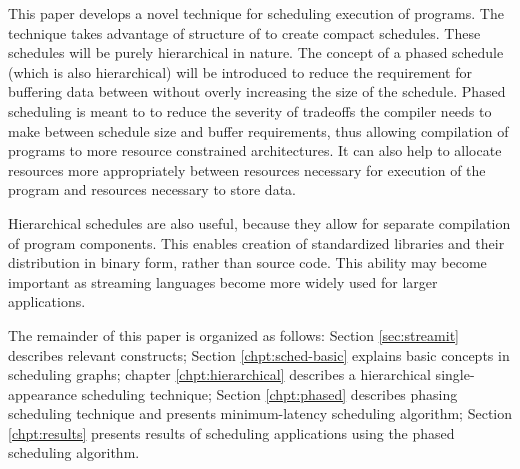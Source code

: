 \begin{comment}
This problem is further complicated by message latency constraints
placed on the program by the programmer.  While {\StreamIt}
programs are meant to provide relatively lax latency requirements,
it is possible to write programs with latency constraints so tight
that very few valid schedules exist. Finding these schedules is a
challenging task.
\end{comment}

This paper develops a novel technique for scheduling execution of
{\StreamIt} programs. The technique takes advantage of structure
of {\StreamIt} to create compact schedules. These schedules will
be purely hierarchical in nature. The concept of a phased schedule
(which is also hierarchical) will be introduced to reduce the
requirement for buffering data between {\filters} without overly
increasing the size of the schedule. Phased scheduling is meant to
to reduce the severity of tradeoffs the compiler needs to make
between schedule size and buffer requirements, thus allowing
compilation of programs to more resource constrained
architectures. It can also help to allocate resources more
appropriately between resources necessary for execution of the
program and resources necessary to store data.

Hierarchical schedules are also useful, because they allow for
separate compilation of program components. This enables creation
of standardized libraries and their distribution in binary form,
rather than source code. This ability may become important as
streaming languages become more widely used for larger
applications.

\begin{comment}
The contributions of this thesis are:
\begin{itemize} \item
hierarchical scheduling of streaming application, a concept
enabled by {\StreamIt} language, \item first formal handling of
{\SDF} graphs with peeking, \item novel phasing scheduling
technique, \item a minimal latency schedule using hierarchical
phases, \item novel {\SDF} program abstraction called the
information buffering model that simplifies information latency
analysis, \item a solution to scheduling of {\StreamIt} programs
with latency constraints.
\end{itemize}
\end{comment}

The remainder of this paper is organized as follows: Section
\ref{sec:streamit} describes relevant {\StreamIt} constructs;
Section \ref{chpt:sched-basic} explains basic concepts in
scheduling {\StreamIt} graphs; chapter \ref{chpt:hierarchical}
describes a hierarchical single-appearance scheduling technique;
Section \ref{chpt:phased} describes phasing scheduling technique
and presents minimum-latency scheduling algorithm; Section
\ref{chpt:results} presents results of scheduling applications
using the phased scheduling algorithm.
